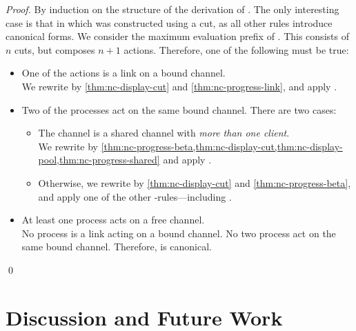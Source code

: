\documentclass[UKenglish]{llncs}
\begin{document}
\begin{proof}
  By induction on the structure of the derivation of \seq[P]{\Gamma}.
  The only interesting case is that in which  was constructed using a cut,
  as all other rules introduce canonical forms.
  We consider the maximum evaluation prefix  of . This consists of
  $n$ cuts, but composes $n+1$ actions. Therefore, one of the following must be
  true:
  \begin{itemize}
  \item
    One of the actions is a link on a bound channel.\\
    We rewrite by \cref{thm:nc-display-cut} and \cref{thm:nc-progress-link},
    and apply .
  \item
    Two of the processes act on the same bound channel. There are two cases:
    \begin{itemize}
    \item
      The channel is a shared channel with \emph{more than one client}.\\
      We rewrite by \cref{thm:nc-progress-beta,thm:nc-display-cut,thm:nc-display-pool,thm:nc-progress-shared} and apply .
    \item
      Otherwise, we rewrite by \cref{thm:nc-display-cut} and
      \cref{thm:nc-progress-beta}, and apply one of the other
      \textbeta-rules---including .
    \end{itemize}
  \item
    At least one process acts on a free channel.\\
    No process is a link acting on a bound channel. No two process act on the
    same bound channel. Therefore,  is canonical.
  \end{itemize}
  \qed
\end{proof}

\section{Discussion and Future Work}\label{sec:discussion}

\clearpage
\printbibliography
\end{document}
